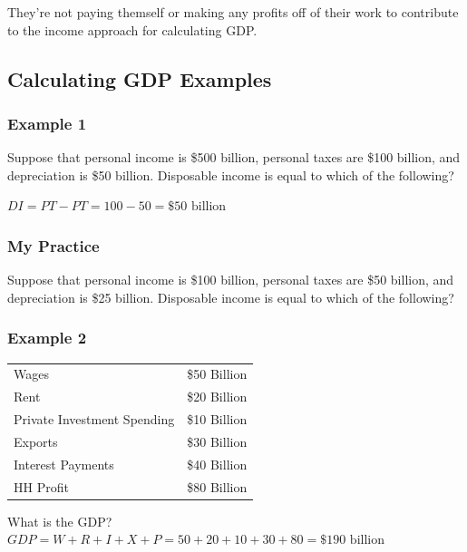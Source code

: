 \documentclass[
  letterpaper,
  DIV=11,
  numbers=noendperiod]{scrartcl}
\begin{document}
They're not paying themself or making any profits off of their work to
contribute to the income approach for calculating GDP.

\subsection{Calculating GDP Examples}\label{calculating-gdp-examples}

\subsubsection{Example 1}\label{example-1}

Suppose that personal income is \$500 billion, personal taxes are \$100
billion, and depreciation is \$50 billion. Disposable income is equal to
which of the following?

\(DI = PT - PT = 100 - 50 = \$50 \text{ billion}\)

\subsubsection{My Practice}\label{my-practice}

Suppose that personal income is \$100 billion, personal taxes are \$50
billion, and depreciation is \$25 billion. Disposable income is equal to
which of the following?

\subsubsection{Example 2}\label{example-2}

\begin{longtable}[]{@{}
  >{\raggedright\arraybackslash}p{}
  >{\raggedright\arraybackslash}p{}@{}}
\toprule\noalign{}
\endhead
\bottomrule\noalign{}
\endlastfoot
Wages & \$50 Billion \\
Rent & \$20 Billion \\
Private Investment Spending & \$10 Billion \\
Exports & \$30 Billion \\
Interest Payments & \$40 Billion \\
HH Profit & \$80 Billion \\
\end{longtable}

What is the GDP?
\(GDP = W + R + I + X + P = 50 + 20 + 10 + 30 + 80 = \$190 \text{ billion}\)
\end{document}
